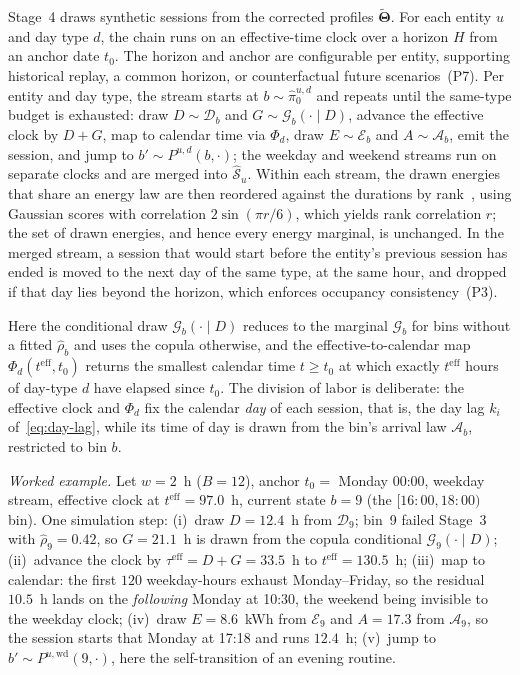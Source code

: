 \documentclass[journal]{IEEEtran}
\begin{document}
Stage~4 draws synthetic sessions from the corrected profiles $\tilde{\boldsymbol{\Theta}}$. For each entity $u$ and day type $d$, the chain runs on an effective-time clock over a horizon $H$ from an anchor date $t_0$. The horizon and anchor are configurable per entity, supporting historical replay, a common horizon, or counterfactual future scenarios~(P7). Per entity and day type, the stream starts at $b \sim \hat{\pi}_0^{u,d}$ and repeats until the same-type budget is exhausted: draw $D \sim \mathcal{D}_b$ and $G \sim \mathcal{G}_b(\cdot \mid D)$, advance the effective clock by $D + G$, map to calendar time via $\Phi_d$, draw $E \sim \mathcal{E}_b$ and $A \sim \mathcal{A}_b$, emit the session, and jump to $b' \sim P^{u,d}(b, \cdot)$; the weekday and weekend streams run on separate clocks and are merged into $\hat{\mathcal{S}}_u$. Within each stream, the drawn energies that share an energy law are then reordered against the durations by rank~\cite{iman1982distribution}, using Gaussian scores with correlation $2\sin(\pi r/6)$, which yields rank correlation $r$; the set of drawn energies, and hence every energy marginal, is unchanged. In the merged stream, a session that would start before the entity's previous session has ended is moved to the next day of the same type, at the same hour, and dropped if that day lies beyond the horizon, which enforces occupancy consistency~(P3).


Here the conditional draw $\mathcal{G}_b(\cdot \mid D)$ reduces to the marginal $\mathcal{G}_b$ for bins without a fitted $\hat{\rho}_b$ and uses the copula otherwise, and the effective-to-calendar map $\Phi_d(t^{\mathrm{eff}}, t_0)$ returns the smallest calendar time $t \geq t_0$ at which exactly $t^{\mathrm{eff}}$ hours of day-type $d$ have elapsed since $t_0$. The division of labor is deliberate: the effective clock and $\Phi_d$ fix the calendar \emph{day} of each session, that is, the day lag $k_i$ of~\eqref{eq:day-lag}, while its time of day is drawn from the bin's arrival law $\mathcal{A}_b$, restricted to bin $b$.

\emph{Worked example.} Let $w = 2$~h ($B = 12$), anchor $t_0 = $ Monday 00:00, weekday stream, effective clock at $t^{\mathrm{eff}} = 97.0$~h, current state $b = 9$ (the $[16{:}00, 18{:}00)$ bin). One simulation step: (i)~draw $D = 12.4$~h from $\mathcal{D}_9$; bin~9 failed Stage~3 with $\hat{\rho}_9 = 0.42$, so $G = 21.1$~h is drawn from the copula conditional $\mathcal{G}_9(\cdot \mid D)$; (ii)~advance the clock by $\tau^{\mathrm{eff}} = D + G = 33.5$~h to $t^{\mathrm{eff}} = 130.5$~h; (iii)~map to calendar: the first $120$ weekday-hours exhaust Monday--Friday, so the residual $10.5$~h lands on the \emph{following} Monday at 10:30, the weekend being invisible to the weekday clock; (iv)~draw $E = 8.6$~kWh from $\mathcal{E}_9$ and $A = 17.3$ from $\mathcal{A}_9$, so the session starts that Monday at 17:18 and runs $12.4$~h; (v)~jump to $b' \sim P^{u,\mathrm{wd}}(9, \cdot)$, here the self-transition of an evening routine.
\end{document}
